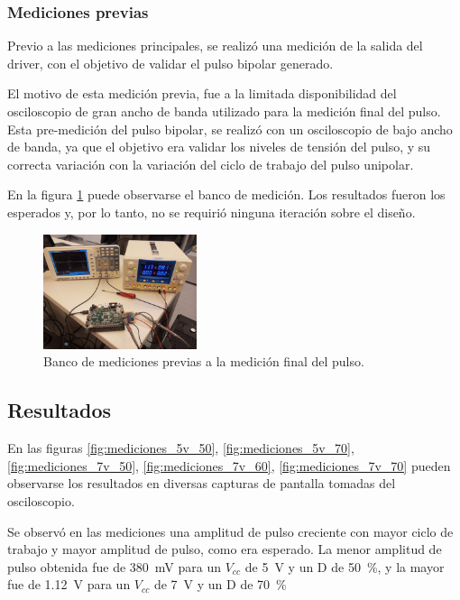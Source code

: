 \subsubsection{Mediciones previas}

Previo a las mediciones principales, se realizó una medición de la salida del driver,
con el objetivo de validar el pulso bipolar generado.

El motivo de esta medición previa, fue a la limitada disponibilidad del osciloscopio de
gran ancho de banda utilizado para la medición final del pulso. Esta pre-medición del pulso bipolar,
se realizó con un osciloscopio de bajo ancho de banda, ya que el objetivo era validar los niveles de
tensión del pulso, y su correcta variación con la variación del ciclo de trabajo del pulso unipolar.

En la figura \ref{fig:banco_pre_mediciones} puede observarse el banco de medición. Los resultados fueron los esperados y,
por lo tanto, no se requirió ninguna iteración sobre el diseño.

\begin{figure}
  \centering
    \includegraphics[width=0.4\textwidth]{images/banco_pre_mediciones.jpg}
    \caption{Banco de mediciones previas a la medición final del pulso.}
    \label{fig:banco_pre_mediciones}
\end{figure}

\subsection{Resultados}

En las figuras \ref{fig:mediciones_5v_50}, \ref{fig:mediciones_5v_70},
\ref{fig:mediciones_7v_50}, \ref{fig:mediciones_7v_60},
\ref{fig:mediciones_7v_70} pueden observarse los resultados en diversas capturas de pantalla
tomadas del osciloscopio.

Se observó en las mediciones una amplitud de pulso creciente con mayor ciclo de
trabajo y mayor amplitud de pulso, como era esperado. La menor amplitud de pulso
obtenida fue de \qty{380}{\milli\volt} para un $V_{cc}$ de \qty{5}{\volt} y un D
de \qty{50}{\percent}, y la mayor fue de \qty{1.12}{\volt} para un $V_{cc}$
de \qty{7}{\volt} y un D de \qty{70}{\percent}

